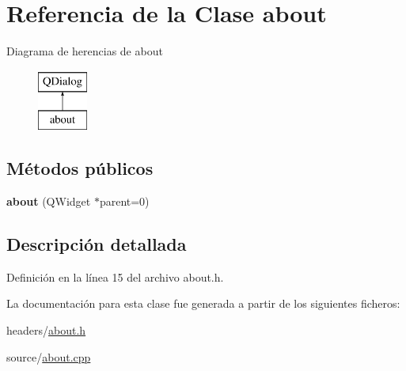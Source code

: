 \hypertarget{classabout}{\section{Referencia de la Clase about}
\label{classabout}
}
Diagrama de herencias de about\begin{figure}[H]
\begin{center}
\leavevmode
\includegraphics[height=2.000000cm]{classabout}
\end{center}
\end{figure}
\subsection*{Métodos públicos}
\begin{DoxyCompactItemize}
\item 
\hypertarget{classabout_ab16a8ec628d97aee17f0332e09964f52}{{\bfseries about} (Q\-Widget $\ast$parent=0)}\label{classabout_ab16a8ec628d97aee17f0332e09964f52}

\end{DoxyCompactItemize}


\subsection{Descripción detallada}


Definición en la línea 15 del archivo about.\-h.



La documentación para esta clase fue generada a partir de los siguientes ficheros\-:\begin{DoxyCompactItemize}
\item 
headers/\hyperlink{about_8h}{about.\-h}\item 
source/\hyperlink{about_8cpp}{about.\-cpp}\end{DoxyCompactItemize}
